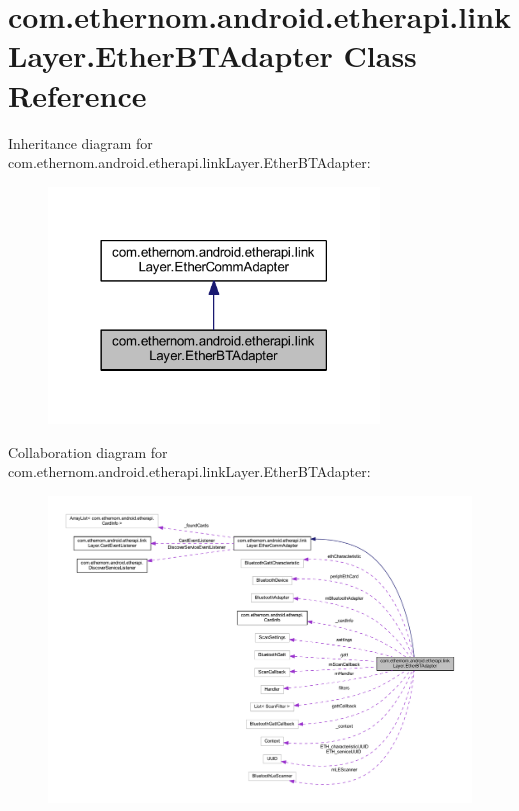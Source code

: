 \hypertarget{classcom_1_1ethernom_1_1android_1_1etherapi_1_1link_layer_1_1_ether_b_t_adapter}{}\section{com.\+ethernom.\+android.\+etherapi.\+link\+Layer.\+Ether\+B\+T\+Adapter Class Reference}
\label{classcom_1_1ethernom_1_1android_1_1etherapi_1_1link_layer_1_1_ether_b_t_adapter}


Inheritance diagram for com.\+ethernom.\+android.\+etherapi.\+link\+Layer.\+Ether\+B\+T\+Adapter\+:\nopagebreak
\begin{figure}[H]
\begin{center}
\leavevmode
\includegraphics[width=249pt]{classcom_1_1ethernom_1_1android_1_1etherapi_1_1link_layer_1_1_ether_b_t_adapter__inherit__graph}
\end{center}
\end{figure}


Collaboration diagram for com.\+ethernom.\+android.\+etherapi.\+link\+Layer.\+Ether\+B\+T\+Adapter\+:\nopagebreak
\begin{figure}[H]
\begin{center}
\leavevmode
\includegraphics[width=350pt]{classcom_1_1ethernom_1_1android_1_1etherapi_1_1link_layer_1_1_ether_b_t_adapter__coll__graph}
\end{center}
\end{figure}
